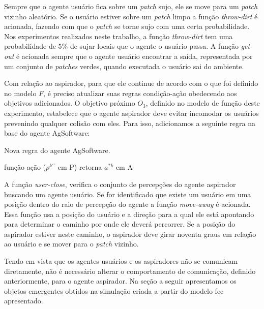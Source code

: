 Sempre que o agente usuário fica sobre um \textit{patch} sujo, ele se move para um \textit{patch} vizinho aleatório. Se o usuário estiver sobre um \textit{patch} limpo a função \textit{throw-dirt} é acionada, fazendo com que o \textit{patch} se torne sujo com uma certa probabilidade. Nos experimentos realizados neste trabalho, a função \textit{throw-dirt} tem uma probabilidade de 5\% de sujar locais que o agente o usuário passa. A função \textit{get-out} é acionada sempre que o agente usuário encontrar a saída, representada por um conjunto de \textit{patches} verdes, quando executada o usuário sai do ambiente. 

Com relação ao aspirador, para que ele continue de acordo com o que foi definido no modelo $F$, é preciso atualizar suas regras condição-ação obedecendo aos objetivos adicionados. O objetivo próximo $O_3$, definido no modelo de função deste experimento, estabelece que o agente aspirador deve evitar incomodar os usuários prevenindo qualquer colisão com eles. Para isso, adicionamos a seguinte regra na base do agente AgSoftware:

\begin{algorithm}[h!]
    \caption{\label{alg:exp3-behaviour-asp} Nova regra do agente AgSoftware.}
    função ação ($p^{k\prime\prime}$ em P) retorna $a^{*k}$ em A\\
\end{algorithm}

A função \textit{user-close}, verifica o conjunto de percepções do agente aspirador buscando um agente usuário. Se for identificado que existe um usuário em uma posição dentro do raio de percepção do agente a função \textit{move-away} é acionada. Essa função usa a posição do usuário e a direção para a qual ele está apontando para determinar o caminho por onde ele deverá percorrer. Se a posição do aspirador estiver neste caminho, o aspirador deve girar noventa graus em relação ao usuário e se mover para o \textit{patch} vizinho.

Tendo em vista que os agentes usuários e os aspiradores não se comunicam diretamente, não é necessário alterar o comportamento de comunicação, definido anteriormente, para o agente aspirador. Na seção a seguir apresentamos os objetos emergentes obtidos na simulação criada a partir do modelo \acrshort{fec} apresentado. 

